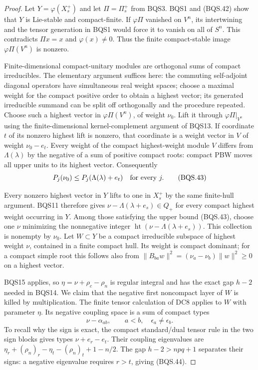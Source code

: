 \begin{proof}
Let $Y=\varphi(X_s^+)$ and let $\Pi=\Pi_s^+$ from BQS3.
BQS1 and (BQS.42) show that $Y$ is Lie-stable and compact-finite.
If $\varphi\Pi$ vanished on $V^n$, its intertwining and the tensor
generation in BQS1 would force it to vanish on all of $S^n$.
This contradicts $\Pi x=x$ and $\varphi(x)\ne0$.
Thus the finite compact-stable image $\varphi\Pi(V^n)$ is nonzero.

Finite-dimensional compact-unitary modules are orthogonal sums of
compact irreducibles.  The elementary argument suffices here:
the commuting self-adjoint diagonal operators have simultaneous real
weight spaces; choose a maximal weight for the compact positive order
to obtain a highest vector; its generated irreducible summand can be
split off orthogonally and the procedure repeated.
Choose such a highest vector in $\varphi\Pi(V^n)$, of weight $\nu_0$.
Lift it through $\varphi\Pi|_{V^n}$ using the finite-dimensional
kernel-complement argument of BQS13.
If coordinate $t$ of its nonzero highest lift is nonzero, that coordinate
is a weight vector in $V$ of weight $\nu_0-e_t$.
Every weight of the compact highest-weight module $V$ differs from
$\Lambda(\lambda)$ by the negative of a sum of positive compact roots:
compact PBW moves all upper units to its highest vector.
Consequently
\[
              P_j(\nu_0)\le P_j(\Lambda(\lambda)+e_t)
                         \quad\hbox{for every }j .
 \tag{BQS.43}
\]

Every nonzero highest vector in $Y$ lifts to one in $X_s^+$ by the
same finite-hull argument.  BQS11 therefore gives
$\nu-\Lambda(\lambda+e_s)\in Q_+$ for every compact highest weight
occurring in $Y$.
Among those satisfying the upper bound (BQS.43), choose one $\nu$
minimizing the nonnegative integer
$\operatorname{ht}(\nu-\Lambda(\lambda+e_s))$.
This collection is nonempty by $\nu_0$.
Let $W\subset Y$ be a compact irreducible subspace of highest weight
$\nu$, contained in a finite compact hull.
Its weight is compact dominant; for a compact simple root this follows
also from
$\|B_{ba}w\|^2=(\nu_a-\nu_b)\|w\|^2\ge0$ on a highest vector.

BQS15 applies, so
$\eta=\nu+\rho_c-\rho_n$ is regular integral and has the exact gap
$h-2$ needed in BQS14.
We claim that the negative first noncompact layer of $W$ is killed
by multiplication.
The finite tensor calculation of DC8 applies to $W$ with parameter
$\eta$.  Its negative coupling space is a sum of compact types
\[
                   \nu-\alpha_{ab},
             \qquad a<b,\quad\epsilon_a\ne\epsilon_b.
 \tag{BQS.44}
\]
To recall why the sign is exact, the compact standard/dual tensor rule
in the two sign blocks gives types $\nu+e_r-e_t$.
Their coupling eigenvalues are
$\eta_r+(\rho_n)_r-\eta_t-(\rho_n)_t+1-n/2$.
The gap $h-2>npq+1$ separates their signs: a negative eigenvalue
requires $r>t$, giving (BQS.44).


\end{proof}
